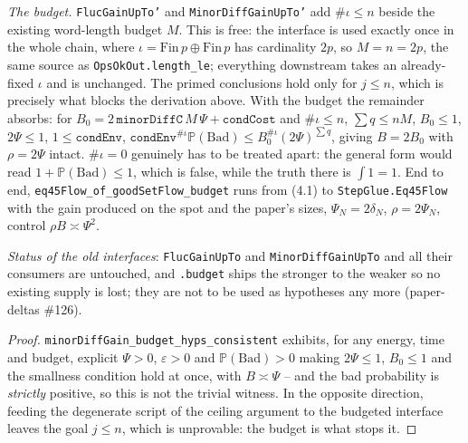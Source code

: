 \begin{theorem}
  \emph{The budget.}  \texttt{FlucGainUpTo'} and \texttt{MinorDiffGainUpTo'} add
  $\#\iota\le n$ beside the existing word-length budget $M$.  This is free: the interface is used
  exactly once in the whole chain, where $\iota=\mathrm{Fin}\,p\oplus\mathrm{Fin}\,p$ has
  cardinality $2p$, so $M=n=2p$, the same source as \texttt{OpsOkOut.length\_le}; everything
  downstream takes an already-fixed $\iota$ and is unchanged.  The primed conclusions hold only
  for $j\le n$, which is precisely what blocks the derivation above.  With the budget the
  remainder absorbs: for $B_0=2\,\texttt{minorDiffC}\,M\,\Psi+\texttt{condCost}$ and
  $\#\iota\le n$, $\sum q\le nM$, $B_0\le1$, $2\Psi\le1$, $1\le\texttt{condEnv}$,
  $\texttt{condEnv}^{\#\iota}\mathbb P(\mathrm{Bad})\le B_0^{\#\iota}(2\Psi)^{\sum q}$, giving
  $B=2B_0$ with $\rho=2\Psi$ intact.  $\#\iota=0$ genuinely has to be treated apart: the general
  form would read $1+\mathbb P(\mathrm{Bad})\le1$, which is false, while the truth there is
  $\int1=1$.  End to end, \texttt{eq45Flow\_of\_goodSetFlow\_budget} runs from (4.1) to
  \texttt{StepGlue.Eq45Flow} with the gain produced on the spot and the paper's sizes,
  $\Psi_N=2\delta_N$, $\rho=2\Psi_N$, control $\rho B\asymp\Psi^2$.

  \emph{Status of the old interfaces}: \texttt{FlucGainUpTo} and \texttt{MinorDiffGainUpTo} and
  all their consumers are untouched, and \texttt{.budget} ships the stronger to the weaker so no
  existing supply is lost; they are not to be used as hypotheses any more (paper-deltas \#126).
\end{theorem}
\begin{proof}\leanok
  \texttt{minorDiffGain\_budget\_hyps\_consistent} exhibits, for any energy, time and budget,
  explicit $\Psi>0$, $\varepsilon>0$ and $\mathbb P(\mathrm{Bad})>0$ making
  $2\Psi\le1$, $B_0\le1$ and the smallness condition hold at once, with $B\asymp\Psi$ -- and the
  bad probability is \emph{strictly} positive, so this is not the trivial witness.  In the
  opposite direction, feeding the degenerate script of the ceiling argument to the budgeted
  interface leaves the goal $j\le n$, which is unprovable: the budget is what stops it.
\end{proof}

